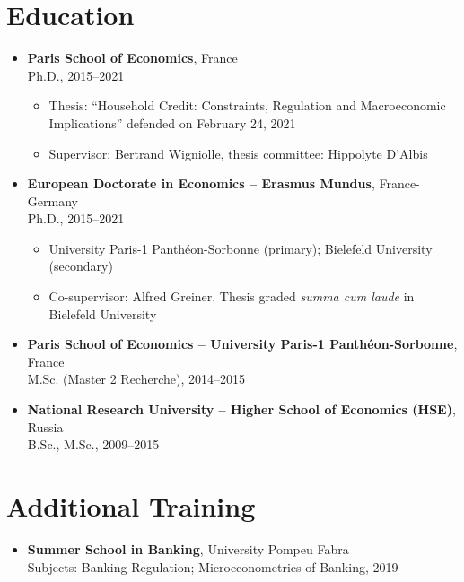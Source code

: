 \documentclass[letterpaper,11pt]{article}
\begin{document}
\section*{Education}
\begin{itemize}[leftmargin=*]
    \item \textbf{Paris School of Economics}, France\\
    Ph.D., 2015--2021
    \begin{itemize}
        \item Thesis: ``Household Credit: Constraints, Regulation and Macroeconomic Implications'' defended on February 24, 2021
        \item Supervisor: Bertrand Wigniolle, thesis committee: Hippolyte D'Albis
    \end{itemize}

    \item \textbf{European Doctorate in Economics -- Erasmus Mundus}, France-Germany\\
    Ph.D., 2015--2021
    \begin{itemize}
        \item University Paris-1 Panthéon-Sorbonne (primary); Bielefeld University (secondary)
        \item Co-supervisor: Alfred Greiner. Thesis graded \emph{summa cum laude} in Bielefeld University
    \end{itemize}

    \item \textbf{Paris School of Economics -- University Paris-1 Panthéon-Sorbonne}, France\\
    M.Sc. (Master 2 Recherche), 2014--2015

    \item \textbf{National Research University -- Higher School of Economics (HSE)}, Russia\\
    B.Sc., M.Sc., 2009--2015
\end{itemize}

\section*{Additional Training}
\begin{itemize}[leftmargin=*]
    \item \textbf{Summer School in Banking}, University Pompeu Fabra\\
    Subjects: Banking Regulation; Microeconometrics of Banking, 2019
\end{itemize}
\end{document}
